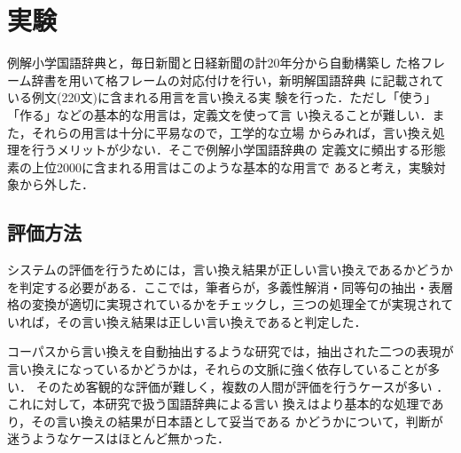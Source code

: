 \section{実験}

例解小学国語辞典\cite{RSK}と，毎日新聞と日経新聞の計20年分から自動構築し
た格フレーム辞書を用いて格フレームの対応付けを行い，新明解国語辞典
\cite{SHINMEIKAI}に記載されている例文(220文)に含まれる用言を言い換える実
験を行った．ただし「使う」「作る」などの基本的な用言は，定義文を使って言
い換えることが難しい．また，それらの用言は十分に平易なので，工学的な立場
からみれば，言い換え処理を行うメリットが少ない．そこで例解小学国語辞典の
定義文に頻出する形態素の上位2000に含まれる用言はこのような基本的な用言で
あると考え，実験対象から外した．


\subsection*{評価方法}

システムの評価を行うためには，言い換え結果が正しい言い換えであるかどうか
を判定する必要がある．ここでは，筆者らが，多義性解消・同等句の抽出・表層
格の変換が適切に実現されているかをチェックし，三つの処理全てが実現されて
いれば，その言い換え結果は正しい言い換えであると判定した．

コーパスから言い換えを自動抽出するような研究では，抽出された二つの表現が
言い換えになっているかどうかは，それらの文脈に強く依存していることが多い．
そのため客観的な評価が難しく，複数の人間が評価を行うケースが多い
\cite{Kimura01,Brazilay01}．これに対して，本研究で扱う国語辞典による言い
換えはより基本的な処理であり，その言い換えの結果が日本語として妥当である
かどうかについて，判断が迷うようなケースはほとんど無かった．


